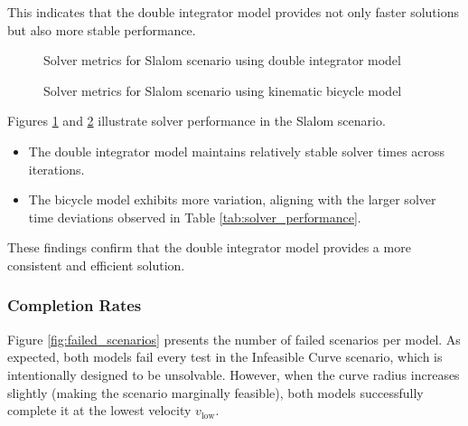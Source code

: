 This indicates that the double integrator model provides not only faster solutions but also more stable performance.

\begin{figure}[h]
	\centering
	\caption{Solver metrics for Slalom scenario using double integrator model}
	\label{fig:slalom_point_mass_model}
\end{figure}

\begin{figure}[h]
	\centering
	\caption{Solver metrics for Slalom scenario using kinematic bicycle model}
	\label{fig:slalom_bicycle_model}
\end{figure}

Figures \ref{fig:slalom_point_mass_model} and \ref{fig:slalom_bicycle_model} illustrate solver performance in the Slalom scenario.
\begin{itemize}
	\item The double integrator model maintains relatively stable solver times across iterations.
	\item The bicycle model exhibits more variation, aligning with the larger solver time deviations observed in Table \ref{tab:solver_performance}.
\end{itemize}

These findings confirm that the double integrator model provides a more consistent and efficient solution.

\subsubsection{Completion Rates}

Figure \ref{fig:failed_scenarios} presents the number of failed scenarios per model.
As expected, both models fail every test in the Infeasible Curve scenario, which is intentionally designed to be unsolvable.
However, when the curve radius increases slightly (making the scenario marginally feasible), both models successfully complete it at the lowest
velocity $v_{\text{low}}$.

